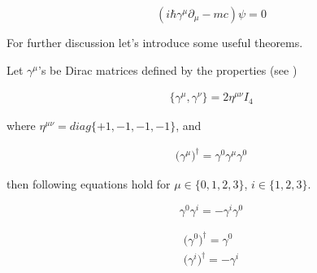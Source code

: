 \begin{equation}
    \label{eq:dirac_equation}
    (i \hbar \gamma^{\mu} \partial_{\mu} - mc) \psi = 0
\end{equation}

For further discussion let's introduce some useful theorems.

\begin{theorem}
    \label{th:gamma_matrices}
    Let $\gamma^{\mu}$'s be Dirac matrices \cite{gamma_matrices} defined by the properties (see \cite{dirac_matrices})

    \begin{equation}
        \label{eq:gamma_matrices_def_1}
        \begin{gathered}
            \big\{\gamma^{\mu}, \gamma^{\nu}\big\} = 2 \eta^{\mu \nu} I_{4}
        \end{gathered}
    \end{equation}

    where $\eta^{\mu \nu} = diag\{+1, -1, -1, -1\}$, and

    \begin{equation}
        \label{eq:gamma_matrices_def_2}
        \begin{gathered}
            \big(\gamma^{\mu}\big)^{\dagger} = \gamma^{0} \gamma^{\mu} \gamma^{0}
        \end{gathered}
    \end{equation}

    then following equations hold for $\mu \in \{0, 1, 2, 3\}$, $i \in \{1, 2, 3\}$.

    \begin{equation}
        \label{eq:gamma_matrices_1}
        \gamma^{0} \gamma^{i} = - \gamma^{i} \gamma^{0}
    \end{equation}

    \begin{equation}
        \label{eq:gamma_matrices_2}
        \begin{gathered}
            \big(\gamma^{0}\big)^{\dagger} = \gamma^{0} \\
            \big(\gamma^{i}\big)^{\dagger} = - \gamma^{i}
        \end{gathered}
    \end{equation}

\end{theorem}

